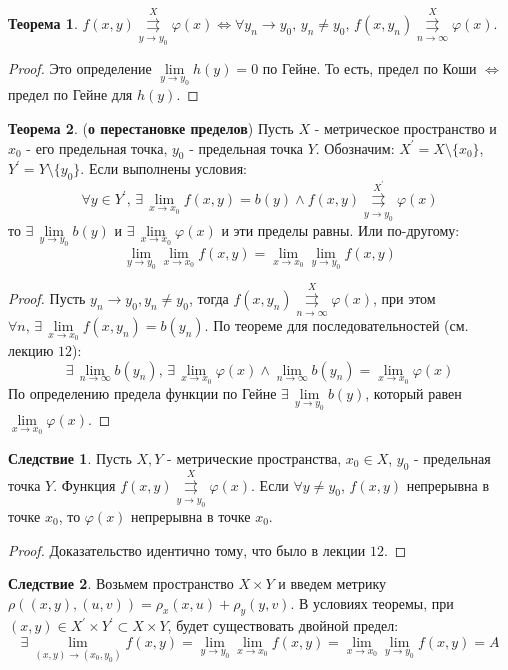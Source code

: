 \documentclass[12pt]{article}
\theoremstyle{definition}
\newtheorem{theorem}{Теорема}
\newtheorem{corollary}{Следствие}
\newcommand{\uconvm}[2]{\overset{#1}{\underset{#2}{\rightrightarrows}}}
\begin{document}
\newpage
\begin{theorem}
	$f(x,y) \uconvm{X}{y \to y_0} \varphi(x) \Leftrightarrow \forall y_n \to y_0, \, y_n \neq y_0, \, f(x,y_n) \uconvm{X}{n \to \infty}\varphi(x)$.
\end{theorem}
\begin{proof}
	Это определение $\lim\limits_{y \to y_0}h(y) = 0$ по Гейне. То есть, предел по Коши $\Leftrightarrow$ предел по Гейне для $h(y)$.
\end{proof}

\begin{theorem}(\textbf{о перестановке пределов})
	Пусть $X$ - метрическое пространство и $x_0$ - его предельная точка, $y_0$ - предельная точка $Y$. Обозначим: $X^\prime = X \setminus \{x_0\}$, $Y^\prime = Y \setminus \{y_0\}$. Если выполнены условия:
	$$
		\forall y \in Y^\prime, \, \exists \, \lim\limits_{x \to x_0}f(x,y) = b(y) \wedge f(x,y) \uconvm{X^\prime}{y \to y_0} \varphi(x)
	$$
	то $\exists \, \lim\limits_{y \to y_0}b(y)$ и $\exists \, \lim\limits_{x \to x_0}\varphi(x)$ и эти пределы равны. Или по-другому:
	$$
		\lim\limits_{y \to y_0}\lim\limits_{x \to x_0}f(x,y) = \lim\limits_{x \to x_0}\lim\limits_{y \to y_0}f(x,y)
	$$
\end{theorem}
\begin{proof}
	Пусть $y_n \to y_0, y_n \neq y_0$, тогда $f(x,y_n) \uconvm{X}{n \to \infty} \varphi(x)$, при этом $\forall n, \, \exists \, \lim\limits_{x \to x_0}f(x,y_n) = b(y_n)$. По теореме для последовательностей (см. лекцию $12$): 
	$$
		\exists \, \lim\limits_{n \to \infty} b(y_n), \, \exists \, \lim\limits_{x \to x_0}\varphi(x) \wedge \lim\limits_{n \to \infty} b(y_n) = \lim\limits_{x \to x_0}\varphi(x)
	$$
	По определению предела функции по Гейне $\exists \, \lim\limits_{y \to y_0}b(y)$, который равен $\lim\limits_{x \to x_0}\varphi(x)$.
\end{proof}
\begin{corollary}
	Пусть $X, Y$ - метрические пространства, $x_0 \in X$, $y_0$ - предельная точка $Y$. Функция $f(x,y) \uconvm{X}{y\to y_0}\varphi(x)$. Если $\forall y \neq y_0$, $f(x,y)$ непрерывна в точке $x_0$, то $\varphi(x)$ непрерывна в точке $x_0$.
\end{corollary}
\begin{proof}
	Доказательство идентично тому, что было в лекции $12$.
\end{proof}
\begin{corollary}
	Возьмем пространство $X \times Y$ и введем метрику $\rho((x,y), (u,v)) = \rho_x(x,u) + \rho_y(y,v)$. В условиях теоремы, при $(x,y) \in X^\prime \times Y^\prime \subset X \times Y$, будет существовать двойной предел:
	$$
		\exists \, \lim\limits_{(x,y) \to (x_0, y_0)}f(x,y) = \lim\limits_{y \to y_0}\lim\limits_{x \to x_0}f(x,y) = \lim\limits_{x \to x_0}\lim\limits_{y \to y_0}f(x,y) = A
	$$
\end{corollary}
\end{document}
